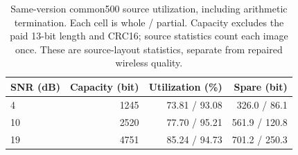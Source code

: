 \begin{table}[t]
\centering
\caption{Same-version common500 source utilization, including arithmetic termination. Each cell is whole / partial. Capacity excludes the paid 13-bit length and CRC16; source statistics count each image once. These are source-layout statistics, separate from repaired wireless quality.}
\label{tab:utilization}
\footnotesize\setlength{\tabcolsep}{4pt}
\begin{tabular}{lrrr}
\toprule
SNR (dB) & Capacity (bit) & Utilization (\%) & Spare (bit) \\
\midrule
4 & 1245 & 73.81 / 93.08 & 326.0 / 86.1 \\
10 & 2520 & 77.70 / 95.21 & 561.9 / 120.8 \\
19 & 4751 & 85.24 / 94.73 & 701.2 / 250.3 \\
\bottomrule
\end{tabular}
\end{table}
